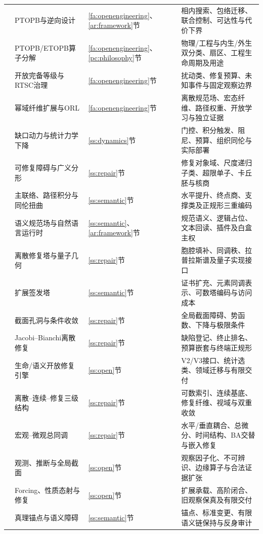 \documentclass[11pt,a4paper]{article}
\theoremstyle{plain}
\theoremstyle{definition}
\theoremstyle{remark}
\begin{document}
\begin{CJK*}{UTF8}{gkai}
\begin{longtable}{P{0.055\textwidth}P{0.235\textwidth}P{0.16\textwidth}P{0.47\textwidth}}
\cite{S13} & PTOPB与逆向设计 & \ref{fa:openengineering}、\ref{ar:framework}节 & 相内搜索、包络迁移、联合控制、可达性与代价下界\\
\cite{S14} & PTOPB/ETOPB算子分解 & \ref{fa:openengineering}、\ref{pc:philosophy}节 & 物理/工程与内生/外生双分类、扇区、工程生命周期及用途\\
\cite{S15} & 开放完备等级与RTSC治理 & \ref{fa:openengineering}节 & 扰动类、修复预算、未知事件与固定观察边界\\
\cite{S16} & 幂域纤维扩展与ORL & \ref{fa:openengineering}节 & 离散规范场、宏态纤维、路径权重、开放学习与独立证据\\
\cite{S17} & 缺口动力与统计力学下降 & \ref{ss:dynamics}节 & 门控、积分触发、阻尼、预算、组织同伦与实际部署\\
\cite{S18} & 可修复障碍与广义分形 & \ref{ss:repair}节 & 修复对象域、尺度递归子类、超限单子、卡丘胚与核商\\
\cite{S19} & 主联络、路径积分与同伦扭曲 & \ref{ss:semantic}节 & 水平提升、终点商、支撑类及正规形三重编码\\
\cite{S20} & 语义规范场与自然语言运行时 & \ref{ss:semantic}、\ref{ar:framework}节 & 规范语义、逻辑占位、文本回读、插件及白盒主权\\
\cite{S21} & 离散修复塔与量子几何 & \ref{ss:repair}节 & 胞腔填补、同调秩、拉普拉斯谱及量子实现接口\\
\cite{S22} & 扩展签发塔 & \ref{ss:semantic}节 & 证书扩充、元素同调表示、可数塔编码与访问成本\\
\cite{S23} & 截面孔洞与条件收敛 & \ref{ss:repair}节 & 全局截面障碍、势函数、下降与极限条件\\
\cite{S24} & Jacobi--Bianchi离散修复 & \ref{ss:repair}节 & 缺陷登记、终止排名、预算嵌套与终端正规形\\
\cite{S25} & 生命/语义开放修复引擎 & \ref{ss:open}节 & V2/V3接口、统计选类、领域迁移与有限交付\\
\cite{S26} & 离散--连续--修复三级结构 & \ref{ss:repair}节 & 可数索引、连续基底、修复纤维、视域与双重收敛\\
\cite{S27} & 宏观--微观总同调 & \ref{ss:repair}节 & 水平/垂直耦合、总微分、时间结构、BA交替与嵌入修复\\
\cite{S28} & 观测、推断与全局截面 & \ref{ss:open}节 & 观察因子化、不可辨识、边缘算子与合法证据扩张\\
\cite{S29} & Forcing、性质态射与修复 & \ref{ss:open}节 & 扩展承载、高阶闭合、旧观察保真及有限交付\\
\cite{S30} & 真理锚点与语义障碍 & \ref{ss:semantic}节 & 锚点、标准变更、有限语义链保持与反身审计\\

\end{longtable}
\end{CJK*}
\end{document}
